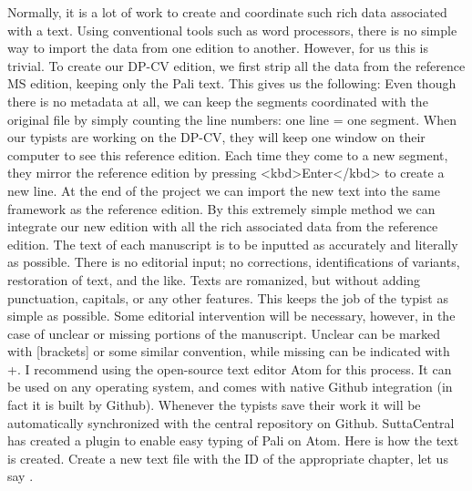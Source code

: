 {}Normally, it is a lot of work to create and coordinate such rich data associated with a text. Using conventional tools such as word processors, there is no simple way to import the data from one edition to another. However, for us this is trivial. To create our DP-CV edition, we first strip all the data from the reference MS edition, keeping only the Pali text. This gives us the following:\markdownRendererInterblockSeparator
{}\markdownRendererInterblockSeparator
{}Even though there is no metadata at all, we can keep the segments coordinated with the original file by simply counting the line numbers: one line = one segment.\markdownRendererInterblockSeparator
{}When our typists are working on the DP-CV, they will keep one window on their computer to see this reference edition. Each time they come to a new segment, they mirror the reference edition by pressing <kbd>Enter</kbd> to create a new line. At the end of the project we can import the new text into the same framework as the reference edition. By this extremely simple method we can integrate our new edition with all the rich associated data from the reference edition.\markdownRendererInterblockSeparator
{}\markdownRendererInterblockSeparator
{}The text of each manuscript is to be inputted as accurately and literally as possible. There is no editorial input; no corrections, identifications of variants, restoration of text, and the like. Texts are romanized, but without adding punctuation, capitals, or any other features. This keeps the job of the typist as simple as possible.\markdownRendererInterblockSeparator
{}Some editorial intervention will be necessary, however, in the case of unclear or missing portions of the manuscript. Unclear  can be marked with [brackets] or some similar convention, while missing  can be indicated with +.\markdownRendererInterblockSeparator
{}I recommend using the open-source text editor Atom for this process. It can be used on any operating system, and comes with native Github integration (in fact it is built by Github). Whenever the typists save their work it will be automatically synchronized with the central repository on Github. SuttaCentral has created a plugin to enable easy typing of Pali on Atom.\markdownRendererInterblockSeparator
{}Here is how the text is created.\markdownRendererInterblockSeparator
{}\markdownRendererOlBeginTight
{}Create a new text file with the ID of the appropriate chapter, let us say .\markdownRendererOlItemEnd 
